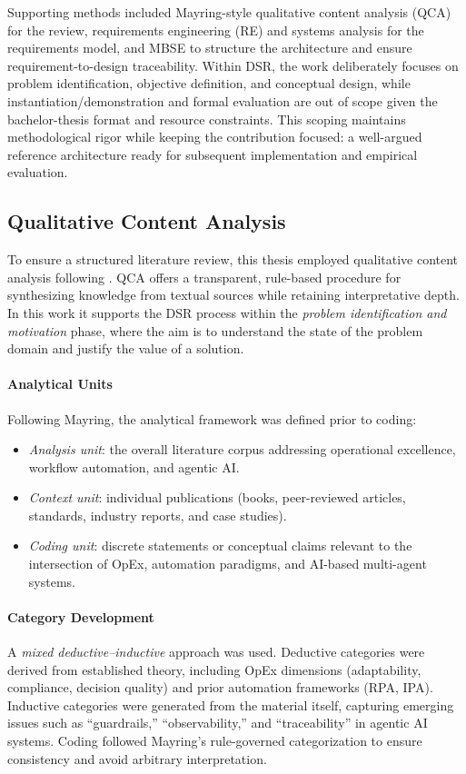 Supporting methods included Mayring-style qualitative content analysis (QCA) for the review, requirements engineering (RE) and systems analysis for the requirements model, and MBSE to structure the architecture and ensure requirement-to-design traceability. Within DSR, the work deliberately focuses on problem identification, objective definition, and conceptual design, while instantiation/demonstration and formal evaluation are out of scope given the bachelor-thesis format and resource constraints. This scoping maintains methodological rigor while keeping the contribution focused: a well-argued reference architecture ready for subsequent implementation and empirical evaluation.

\subsection{Qualitative Content Analysis}\label{subsec:qca}
To ensure a structured literature review, this thesis employed qualitative content analysis following \textcite{mayringQualitativeContentAnalysis2022}. 
QCA offers a transparent, rule-based procedure for synthesizing knowledge from textual sources while retaining interpretative depth. 
In this work it supports the DSR process \parencite{peffersDesignScienceMethodology2007} within the \emph{problem identification and motivation} phase, 
where the aim is to understand the state of the problem domain and justify the value of a solution.

\paragraph*{Analytical Units}
Following Mayring, the analytical framework was defined prior to coding:
\begin{itemize}
    \item \textit{Analysis unit}: the overall literature corpus addressing operational excellence, workflow automation, and agentic AI.
    \item \textit{Context unit}: individual publications (books, peer-reviewed articles, standards, industry reports, and case studies).
    \item \textit{Coding unit}: discrete statements or conceptual claims relevant to the intersection of OpEx, automation paradigms, and AI-based multi-agent systems.
\end{itemize}

\paragraph*{Category Development}
A \emph{mixed deductive--inductive} approach was used. Deductive categories were derived from established theory, including OpEx dimensions (adaptability, compliance, decision quality) and prior automation frameworks (RPA, IPA). 
Inductive categories were generated from the material itself, capturing emerging issues such as ``guardrails,'' ``observability,'' and ``traceability'' in agentic AI systems. 
Coding followed Mayring's rule-governed categorization to ensure consistency and avoid arbitrary interpretation.

